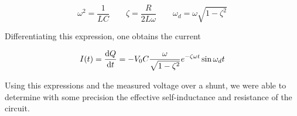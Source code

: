 $$
\omega^2 = \frac{1}{LC} \qquad
\zeta = \frac{R}{2L \omega} \qquad
\omega_d = \omega \sqrt{1-\zeta^2}
$$

Differentiating this expression, one obtains the current

\begin{equation}
\label{current}
I(t) = \frac{\mathrm d Q}{\mathrm d t} = -V_0 C \frac{\omega}{\sqrt{1-\zeta^2}} e^{-\zeta \omega 
t} \sin{\omega_d t}
\end{equation}

Using this expressions and the measured voltage over a shunt, we were able to 
determine with some precision the effective self-inductance and resistance of 
the circuit.
